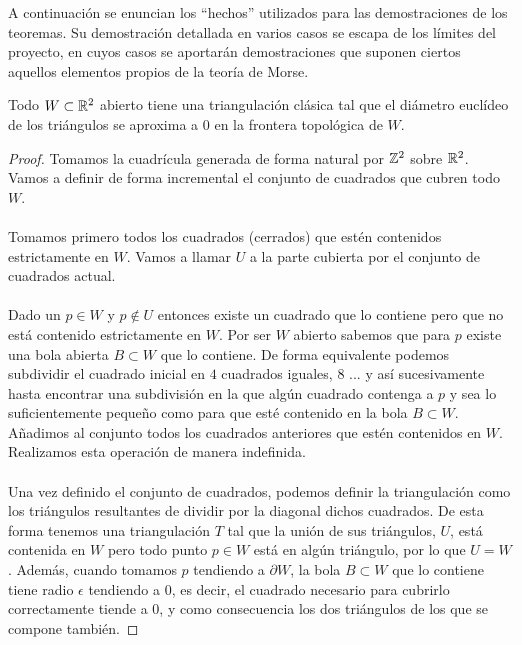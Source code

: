 
A continuación se enuncian los ``hechos'' utilizados para las demostraciones de los teoremas. Su demostración detallada en varios casos se escapa de los límites del proyecto, en cuyos casos se aportarán demostraciones que suponen ciertos aquellos elementos propios de la teoría de Morse.

\begin{hecho}
	Todo $W \subset \mathbb{R}^2$ abierto tiene una triangulación clásica tal que el diámetro euclídeo de los triángulos se aproxima a $0$ en la frontera topológica de $W$.
\end{hecho}

\begin{proof}
	Tomamos la cuadrícula generada de forma natural por $\mathbb{Z}^2$ sobre $\mathbb{R}^2$. Vamos a definir de forma incremental el conjunto de cuadrados que cubren todo $W$.\\
	\\ Tomamos primero todos los cuadrados (cerrados) que estén contenidos estrictamente en $W$. Vamos a llamar $U$ a la parte cubierta por el conjunto de cuadrados actual.\\
	\\ Dado un $p \in W$ y $p \not \in U$ entonces existe un cuadrado que lo contiene pero que no está contenido estrictamente en $W$. Por ser $W$ abierto sabemos que para $p$ existe una bola abierta $B \subset W$ que lo contiene. De forma equivalente podemos subdividir el cuadrado inicial en $4$ cuadrados iguales, $8$ ... y así sucesivamente hasta encontrar una subdivisión en la que algún cuadrado contenga a $p$ y sea lo suficientemente pequeño como para que esté contenido en la bola $B \subset W$. Añadimos al conjunto todos los cuadrados anteriores que estén contenidos en $W$. Realizamos esta operación de manera indefinida.\\
	\\ Una vez definido el conjunto de cuadrados, podemos definir la triangulación como los triángulos resultantes de dividir por la diagonal dichos cuadrados. De esta forma tenemos una triangulación $T$ tal que la unión de sus triángulos, $U$, está contenida en $W$ pero todo punto $p \in W$ está en algún triángulo, por lo que $U = W$. Además, cuando tomamos $p$ tendiendo a $\partial W$, la bola $B \subset W$ que lo contiene tiene radio $\epsilon$ tendiendo a $0$, es decir, el cuadrado necesario para cubrirlo correctamente tiende a $0$, y como consecuencia los dos triángulos de los que se compone también.
\end{proof}


